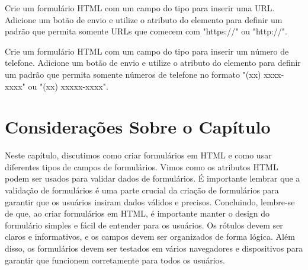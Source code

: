 \begin{exercise}
Crie um formulário HTML com um campo do tipo  para inserir uma URL. Adicione um botão de envio e utilize o atributo  do elemento  para definir um padrão que permita somente URLs que comecem com "https://" ou "http://".
\end{exercise}

\begin{exercise}
Crie um formulário HTML com um campo do tipo  para inserir um número de telefone. Adicione um botão de envio e utilize o atributo  do elemento  para definir um padrão que permita somente números de telefone no formato "(xx) xxxx-xxxx" ou "(xx) xxxxx-xxxx".
\end{exercise}

\section{Considerações Sobre o Capítulo}

Neste capítulo, discutimos como criar formulários em HTML e como usar diferentes tipos de campos de formulários. Vimos como os atributos HTML podem ser usados para validar dados de formulários. É importante lembrar que a validação de formulários é uma parte crucial da criação de formulários para garantir que os usuários insiram dados válidos e precisos. Concluindo, lembre-se de que, ao criar formulários em HTML, é importante manter o design do formulário simples e fácil de entender para os usuários. Os rótulos devem ser claros e informativos, e os campos devem ser organizados de forma lógica. Além disso, os formulários devem ser testados em vários navegadores e dispositivos para garantir que funcionem corretamente para todos os usuários.